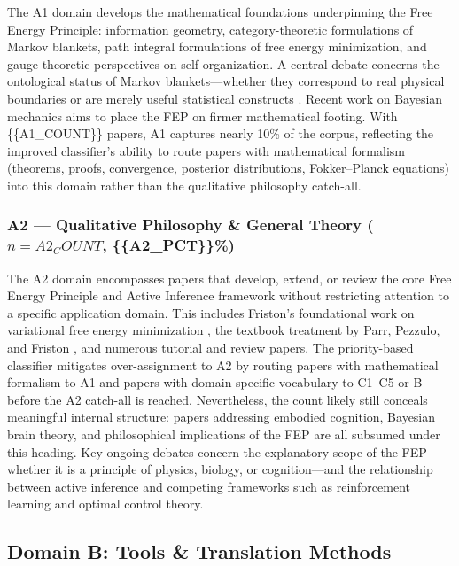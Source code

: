 \documentclass[
]{article}
\begin{document}
The A1 domain develops the mathematical foundations underpinning the
Free Energy Principle: information geometry, category-theoretic
formulations of Markov blankets, path integral formulations of free
energy minimization, and gauge-theoretic perspectives on
self-organization. A central debate concerns the ontological status of
Markov blankets---whether they correspond to real physical boundaries or
are merely useful statistical constructs \citep{bruineberg2022emperor}.
Recent work on Bayesian mechanics \citep{sakthivadivel2023bayesian} aims
to place the FEP on firmer mathematical footing. With \{\{A1\_COUNT\}\}
papers, A1 captures nearly 10\% of the corpus, reflecting the improved
classifier's ability to route papers with mathematical formalism
(theorems, proofs, convergence, posterior distributions, Fokker--Planck
equations) into this domain rather than the qualitative philosophy
catch-all.

\subsubsection{\texorpdfstring{A2 --- Qualitative Philosophy \& General
Theory (\(n = {{A2_COUNT}}\),
\{\{A2\_PCT\}\}\%)}{A2 --- Qualitative Philosophy \& General Theory (n = \{\{A2\_COUNT\}\}, \{\{A2\_PCT\}\}\%)}}\label{a2-qualitative-philosophy-general-theory-n-a2_count-a2_pct}

The A2 domain encompasses papers that develop, extend, or review the
core Free Energy Principle and Active Inference framework without
restricting attention to a specific application domain. This includes
Friston's foundational work on variational free energy minimization
\citep{friston2010free}, the textbook treatment by Parr, Pezzulo, and
Friston \citep{parr2022active}, and numerous tutorial and review papers.
The priority-based classifier mitigates over-assignment to A2 by routing
papers with mathematical formalism to A1 and papers with domain-specific
vocabulary to C1--C5 or B before the A2 catch-all is reached.
Nevertheless, the count likely still conceals meaningful internal
structure: papers addressing embodied cognition, Bayesian brain theory,
and philosophical implications of the FEP are all subsumed under this
heading. Key ongoing debates concern the explanatory scope of the
FEP---whether it is a principle of physics, biology, or cognition---and
the relationship between active inference and competing frameworks such
as reinforcement learning and optimal control theory.

\subsection{Domain B: Tools \& Translation
Methods}\label{domain-b-tools-translation-methods}
\end{document}
